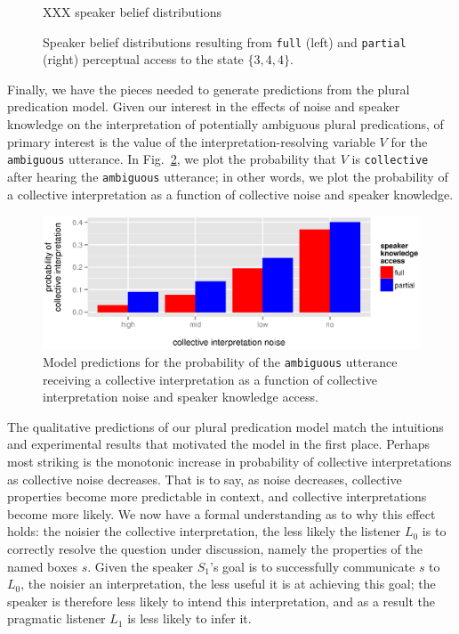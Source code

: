 \documentclass[linguex]{sp}
\begin{document}
\begin{figure}[h]
	XXX speaker belief distributions
	\caption{Speaker belief distributions resulting from \texttt{full} (left) and \texttt{partial} (right) perceptual access to the state $\{3,4,4\}$.} \label{speakerbelief}
\end{figure}

Finally, we have the pieces needed to generate predictions from the plural predication model. Given our interest in the effects of noise and speaker knowledge on the interpretation of potentially ambiguous plural predications, of primary interest is the value of the interpretation-resolving variable $V$ for the \texttt{ambiguous} utterance. In Fig.~\ref{modelresults}, we plot the probability that $V$ is \texttt{collective} after hearing the \texttt{ambiguous} utterance; in other words, we plot the probability of a collective interpretation as a function of collective noise and speaker knowledge.

\begin{figure}[h]
	\centering
	\includegraphics[width=\linewidth]{plots/model-results.eps}
	\vspace{-20pt}
	\caption{Model predictions for the probability of the \texttt{ambiguous} utterance receiving a collective interpretation as a function of collective interpretation noise and speaker knowledge access.} \label{modelresults}
\end{figure}

The qualitative predictions of our plural predication model match the intuitions and experimental results that motivated the model in the first place. Perhaps most striking is the monotonic increase in probability of collective interpretations as collective noise decreases. That is to say, as noise decreases, collective properties become more predictable in context, and collective interpretations become more likely. We now have a formal understanding as to why this effect holds: the noisier the collective interpretation, the less likely the listener $L_{0}$ is to correctly resolve the question under discussion, namely the properties of the named boxes $s$. Given the speaker $S_{1}$'s goal is to successfully communicate $s$ to $L_{0}$, the noisier an interpretation, the less useful it is at achieving this goal; the speaker is therefore less likely to intend this interpretation, and as a result the pragmatic listener $L_{1}$ is less likely to infer it.
\end{document}

